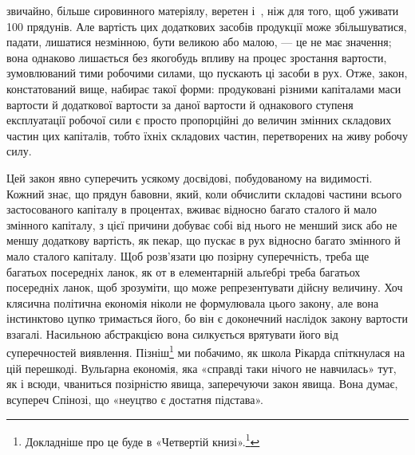 \parcont{}  %
звичайно, більше сировинного матеріялу, веретен і~, ніж
для того, щоб уживати 100 прядунів. Але вартість цих додаткових
засобів продукції може збільшуватися, падати, лишатися незмінною,
бути великою або малою, — це не має значення; вона однаково
лишається без якогобудь впливу на процес зростання вартости,
зумовлюваний тими робочими силами, що пускають ці
засоби в рух. Отже, закон, констатований вище, набирає такої
форми: продуковані різними капіталами маси вартости й додаткової
вартости за даної вартости й однакового ступеня експлуатації
робочої сили є просто пропорційні до величин змінних складових
частин цих капіталів, тобто їхніх складових частин, перетворених
на живу робочу силу.

Цей закон явно суперечить усякому досвідові, побудованому
на видимості. Кожний знає, що прядун бавовни, який, коли
обчислити складові частини всього застосованого капіталу в процентах,
вживає відносно багато сталого й мало змінного капіталу,
з цієї причини добуває собі від нього не менший зиск або не меншу
додаткову вартість, як пекар, що пускає в рух відносно багато
змінного й мало сталого капіталу. Щоб розв’язати цю позірну
суперечність, треба ще багатьох посередніх ланок, як от в елементарній
альґебрі треба багатьох посередніх ланок, щоб зрозуміти,
що  може репрезентувати дійсну величину. Хоч клясична політична
економія ніколи не формулювала цього закону, але вона
інстинктово цупко тримається його, бо він є доконечний наслідок
закону вартости взагалі. Насильною абстракцією вона силкується
врятувати його від суперечностей виявлення. Пізніш\footnote{
Докладніше про це буде в «Четвертій книзі».\footnote*{
Мова йде про «Теорії додаткової вартости», що їх Маркс мав на
думці видати як «Четверту книгу Капіталу». \emph{Ред.}
}
}
ми побачимо, як школа Рікарда спіткнулася на цій перешкоді.
Вульґарна економія, яка «справді таки нічого не навчилась»
тут, як і всюди, чваниться позірністю явища, заперечуючи закон
явища. Вона думає, всупереч Спінозі, що «неуцтво є достатня
підстава».

